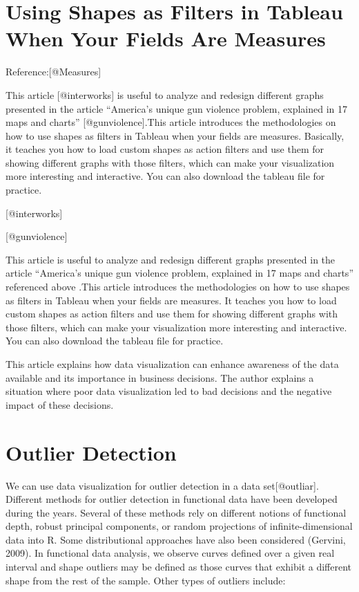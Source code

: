 \documentclass[]{book}
\theoremstyle{definition}
\theoremstyle{definition}
\theoremstyle{definition}
\theoremstyle{remark}
\begin{document}
\section{Using Shapes as Filters in Tableau When Your Fields Are
Measures}\label{using-shapes-as-filters-in-tableau-when-your-fields-are-measures}

Reference:{[}@Measures{]}

This article {[}@interworks{]} is useful to analyze and redesign
different graphs presented in the article ``America's unique gun
violence problem, explained in 17 maps and charts''
{[}@gunviolence{]}.This article introduces the methodologies on how to
use shapes as filters in Tableau when your fields are measures.
Basically, it teaches you how to load custom shapes as action filters
and use them for showing different graphs with those filters, which can
make your visualization more interesting and interactive. You can also
download the tableau file for practice.

{[}@interworks{]}

{[}@gunviolence{]}

This article is useful to analyze and redesign different graphs
presented in the article ``America's unique gun violence problem,
explained in 17 maps and charts'' referenced above .This article
introduces the methodologies on how to use shapes as filters in Tableau
when your fields are measures. It teaches you how to load custom shapes
as action filters and use them for showing different graphs with those
filters, which can make your visualization more interesting and
interactive. You can also download the tableau file for practice.

This article explains how data visualization can enhance awareness of
the data available and its importance in business decisions. The author
explains a situation where poor data visualization led to bad decisions
and the negative impact of these decisions.

\section{Outlier Detection}\label{outlier-detection}

We can use data visualization for outlier detection in a data
set{[}@outliar{]}. Different methods for outlier detection in functional
data have been developed during the years. Several of these methods rely
on different notions of functional depth, robust principal components,
or random projections of infinite-dimensional data into R. Some
distributional approaches have also been considered (Gervini, 2009). In
functional data analysis, we observe curves defined over a given real
interval and shape outliers may be defined as those curves that exhibit
a different shape from the rest of the sample. Other types of outliers
include:
\end{document}
